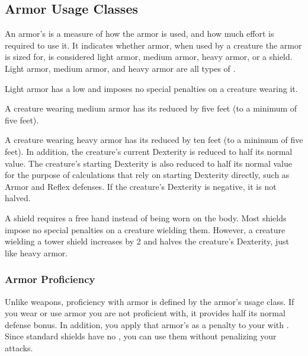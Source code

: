     \subsection{Armor Usage Classes}\label{Armor Usage Classes}
        An armor's  is a measure of how the armor is used, and how much effort is required to use it.
        It indicates whether armor, when used by a creature the armor is sized for, is considered light armor, medium armor, heavy armor, or a shield.
        Light armor, medium armor, and heavy armor are all types of .

         Light armor has a low  and imposes no special penalties on a creature wearing it.

         A creature wearing medium armor has its  reduced by five feet (to a minimum of five feet).

         A creature wearing heavy armor has its  reduced by ten feet (to a minimum of five feet).
        In addition, the creature's current Dexterity is reduced to half its normal value.
        The creature's starting Dexterity is also reduced to half its normal value for the purpose of calculations that rely on starting Dexterity directly, such as Armor and Reflex defenses.
        If the creature's Dexterity is negative, it is not halved.

         A shield requires a free hand instead of being worn on the body.
        Most shields impose no special penalties on a creature wielding them.
        However, a creature wielding a tower shield increases  by 2 and halves the creature's Dexterity, just like heavy armor.

        \subsubsection{Armor Proficiency}\label{Armor Proficiency}
            Unlike weapons, proficiency with armor is defined by the armor's usage class.
            If you wear or use armor you are not proficient with, it provides half its normal defense bonus.
            In addition, you apply that armor's  as a penalty to your  with .
            Since standard shields have no , you can use them without penalizing your attacks.

